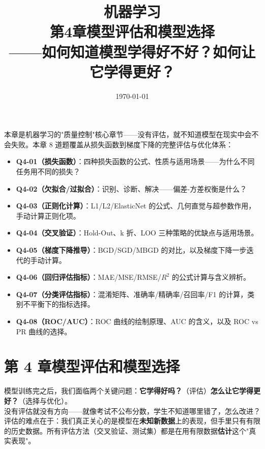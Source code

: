 \documentclass[a4paper,11pt]{ctexart}
\title{\textbf{机器学习\\第4章\quad 模型评估和模型选择}\\[0.5em]
{\large\color{gray}——如何知道模型学得好不好？如何让它学得更好？}}
\date{\today}
\begin{document}
\maketitle

\begin{beginnerbox}
    本章是机器学习的"质量控制"核心章节——没有评估，就不知道模型在现实中会不会失败。本章 8 道题覆盖从损失函数到梯度下降的完整评估与优化体系：
    \begin{itemize}
        \item \textbf{Q4-01（损失函数）}：四种损失函数的公式、性质与适用场景——为什么不同任务用不同的损失？
        \item \textbf{Q4-02（欠拟合/过拟合）}：识别、诊断、解决——偏差-方差权衡是什么？
        \item \textbf{Q4-03（正则化计算）}：L1/L2/ElasticNet 的公式、几何直觉与超参数作用，手动计算正则化项。
        \item \textbf{Q4-04（交叉验证）}：Hold-Out、k 折、LOO 三种策略的优缺点与适用场景。
        \item \textbf{Q4-05（梯度下降推导）}：BGD/SGD/MBGD 的对比，以及梯度下降一步迭代的手动计算。
        \item \textbf{Q4-06（回归评估指标）}：MAE/MSE/RMSE/$R^2$ 的公式计算与含义辨析。
        \item \textbf{Q4-07（分类评估指标）}：混淆矩阵、准确率/精确率/召回率/F1 的计算，类别不平衡下的指标选择。
        \item \textbf{Q4-08（ROC/AUC）}：ROC 曲线的绘制原理、AUC 的含义，以及 ROC vs PR 曲线的选择。
    \end{itemize}
\end{beginnerbox}

\section{第 4 章\quad 模型评估和模型选择}

\begin{metaphorbox}
    模型训练完之后，我们面临两个关键问题：\textbf{它学得好吗？}（评估）\textbf{怎么让它学得更好？}（选择与优化）。\\
    没有评估就没有方向——就像考试不公布分数，学生不知道哪里错了，怎么改进？\\
    评估的难点在于：我们真正关心的是模型在\textbf{未知新数据}上的表现，但手里只有有限的历史数据。所有评估方法（交叉验证、测试集）都是在用有限数据\textbf{估计}这个"真实表现"。
\end{metaphorbox}
\end{document}
